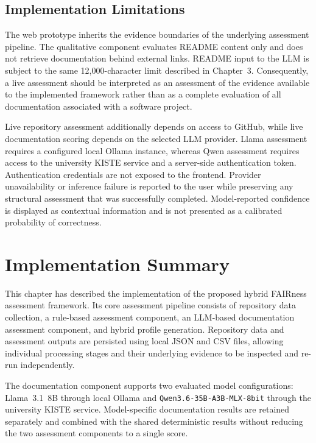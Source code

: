 \FloatBarrier
\subsection{Implementation Limitations}

The web prototype inherits the evidence boundaries of the underlying
assessment pipeline. The qualitative component evaluates README
content only and does not retrieve documentation behind external
links. README input to the LLM is subject to the same 12{,}000-character
limit described in Chapter~3. Consequently, a live assessment should
be interpreted as an assessment of the evidence available to the
implemented framework rather than as a complete evaluation of all
documentation associated with a software project.

Live repository assessment additionally depends on access to GitHub,
while live documentation scoring depends on the selected LLM
provider. Llama assessment requires a configured local Ollama
instance, whereas Qwen assessment requires access to the university
KISTE service and a server-side authentication token. Authentication
credentials are not exposed to the frontend. Provider unavailability
or inference failure is reported to the user while preserving any
structural assessment that was successfully completed.
Model-reported confidence is displayed as contextual information and
is not presented as a calibrated probability of correctness.

\section{Implementation Summary}

This chapter has described the implementation of the proposed hybrid
FAIRness assessment framework. Its core assessment pipeline consists
of repository data collection, a rule-based assessment component, an
LLM-based documentation assessment component, and hybrid profile
generation. Repository data and assessment outputs are persisted using
local JSON and CSV files, allowing individual processing stages and
their underlying evidence to be inspected and re-run independently.

The documentation component supports two evaluated model
configurations: Llama~3.1~8B through local Ollama and
\texttt{Qwen3.6-35B-A3B-MLX-8bit} through the university KISTE
service. Model-specific documentation results are retained separately
and combined with the shared deterministic results without reducing
the two assessment components to a single score.

